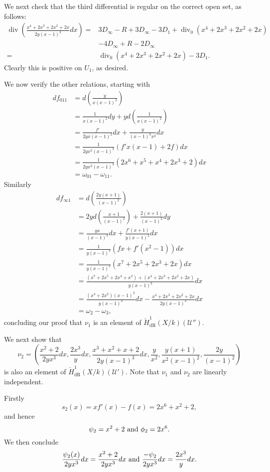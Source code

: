 \documentclass[draft, 11pt]{article} %
\theoremstyle{plain}
\theoremstyle{remark}
\newcommand{\cU}{{\mathcal U}}
\newcommand{\cechderhamhone}{\check{H}_{\text {dR}}^1(X/k)}
\DeclareMathOperator{\di}{div}
\begin{document}
We next check that the third differential is regular on the correct open set, as follows:
\begin{align*}
\di \left( \frac{x^4 + 2x^3 + 2x^2 + 2x}{2y(x-1)^3}dx \right) = & 3D_\infty -R +3D_\infty -3D_1 +\di_0(x^4+2x^3+2x^2+2x) \\
&  -4D_\infty +R -2D_\infty \\
= & \di_0(x^4 + 2x^3 + 2x^2 + 2x) - 3D_1.
\end{align*}
Clearly this is positive on $U_1$, as desired.

We now verify the other relations, starting with
\begin{align*}
df_{0 1 1} & = d \left( \frac{y}{x(x-1)^2} \right) \\
& = \frac{1}{x(x-1)^2}dy + y d \left( \frac{1}{x(x-1)^2} \right) \\
& = \frac{f'}{2yx(x-1)^2}dx + \frac{y}{(x-1)^3x^2}dx \\
& = \frac{1}{2yx^2(x-1)^3}\left( f'x(x-1) +2f\right)dx \\
& = \frac{1}{2yx^2(x-1)^3}(2x^6+x^5+x^4+2x^3+2)dx \\
& = \omega_{0 1} - \omega_{1 1}.
\end{align*}
Similarly
\begin{align*}
df_{\infty 1} & = d \left( \frac{2y(x+1)}{(x-1)^2} \right) \\
& = 2yd\left( \frac{x+1}{(x-1)^2} \right) + \frac{2(x+1)}{(x-1)^2}dy \\
& = \frac{yx}{(x-1)^3} dx + \frac{f'(x+1)}{y(x-1)^2}dx \\
& = \frac{1}{y(x-1)^3}(fx + f'(x^2-1))dx \\
& = \frac{1}{y(x-1)^3} (x^7 + 2x^5 + 2x^3 + 2x)dx \\
& = \frac{(x^7 + 2x^5 + 2x^4 +x^2) + (x^4 + 2x^3 + 2x^2 + 2x)}{y(x-1)^3} dx \\
& = \frac{(x^4+2x^2)(x-1)^3}{y(x-1)^3}dx - \frac{x^4+2x^3+2x^2+2x}{2y(x-1)^3}dx \\
& = \omega_2 - \omega_3,
\end{align*}
concluding our proof that $\nu_1$ is an element of $\cechderhamhone(\cU'')$.

We next show that
\[
\nu_2 = \left( \frac{x^2+2}{2yx^3}dx, \frac{2x^3}{y}dx, \frac{x^3+x^2+x+2}{2y(x-1)^3}dx, \frac{y}{x^2}, \frac{y(x+1)}{x^2(x-1)^2}, \frac{2y}{(x-1)^2} \right) 
\]
is also an element of $\cechderhamhone(\cU')$.
Note that $\nu_1$ and $\nu_2$ are linearly independent.

Firstly
\[
s_2(x) = xf'(x) - f(x) = 2x^6 + x^2 +2,
\]
and hence
\[
\psi_2 = x^2 + 2 \ {\rm and} \ \phi_2 = 2x^6.
\]
We then conclude
\[
\frac{\psi_2(x)}{2yx^3}dx = \frac{x^2+2}{2yx^3}dx \ {\rm and} \ \frac{-\psi_2}{2yx^3}dx = \frac{2x^3}{y}dx.
\]
\end{document}
